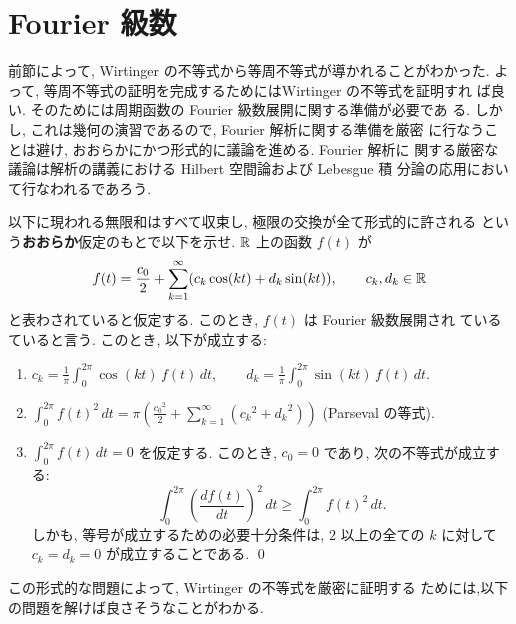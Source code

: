 \documentclass[12pt,twoside]{jarticle}
\def\R{{\Bbb R}} %
\begin{document}

\section{Fourier 級数}

前節によって, Wirtinger の不等式から等周不等式が導かれることがわかった. 
よって, 等周不等式の証明を完成するためにはWirtinger の不等式を証明すれ
ば良い. そのためには周期函数の Fourier 級数展開に関する準備が必要であ
る. しかし, これは幾何の演習であるので, Fourier 解析に関する準備を厳密
に行なうことは避け, おおらかにかつ形式的に議論を進める. Fourier 解析に
関する厳密な議論は解析の講義における Hilbert 空間論および Lebesgue 積
分論の応用において行なわれるであろう.

\begin{question}\label{q:Fourier1}
  以下に現われる無限和はすべて収束し, 極限の交換が全て形式的に許される
  という{\bf おおらか}仮定のもとで以下を示せ.  $\R$ 上の函数 $f(t)$ が %
  \[%
    f(t)
    = \frac{c_0}{2} + \sum_{k=1}^\infty (c_k \cos(kt) + d_k \sin(kt)),
    \qquad
    c_k, d_k \in \R
  \]%
  と表わされていると仮定する. このとき, $f(t)$ は Fourier 級数展開され
  ているていると言う. このとき, 以下が成立する:
  \begin{enumerate}
  \item 
    \( \displaystyle
      c_k = \frac{1}{\pi} \int_0^{2\pi} \cos(kt)\, f(t) \,dt,
      \qquad
      d_k = \frac{1}{\pi} \int_0^{2\pi} \sin(kt)\, f(t) \,dt.
    \)
  \item
    \( \displaystyle
      \int_0^{2\pi} f(t)^2 \,dt
      = \pi \left(
          \frac{{c_0}^2}{2} + \sum_{k=1}^\infty ({c_k}^2 + {d_k}^2)
        \right)
    \)
    \qquad (Parseval の等式).
  \item $\int_0^{2\pi} f(t) \,dt = 0$ を仮定する. このとき, $c_0 = 0$ %
    であり, 次の不等式が成立する:
    \[
      \int_0^{2\pi} \left( \frac{df(t)}{dt} \right)^2 \,dt
      \ge
      \int_0^{2\pi} f(t)^2 \,dt.
    \]
    しかも, 等号が成立するための必要十分条件は, %
    $2$ 以上の全ての $k$ に対して $c_k = d_k = 0$ が成立することである.
    \qed
  \end{enumerate}
\end{question}

\noindent この形式的な問題によって, Wirtinger の不等式を厳密に証明する
ためには,以下の問題を解けば良さそうなことがわかる.
\end{document}
